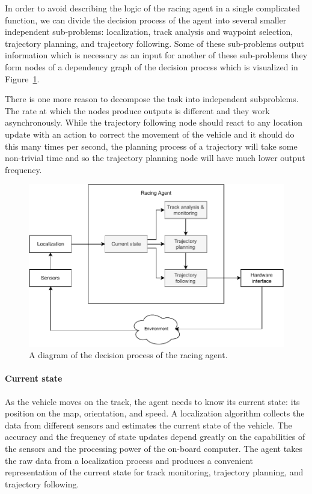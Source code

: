 In order to avoid describing the logic of the racing agent in a single complicated function, we can divide the decision process of the agent into several smaller independent sub-problems: localization, track analysis and waypoint selection, trajectory planning, and trajectory following. Some of these sub-problems output information which is necessary as an input for another of these sub-problems they form nodes of a dependency graph of the decision process which is visualized in Figure~\ref{fig:racing_agent_diagram}.

There is one more reason to decompose the task into independent subproblems. The rate at which the nodes produce outputs is different and they work asynchronously. While the trajectory following node should react to any location update with an action to correct the movement of the vehicle and it should do this many times per second, the planning process of a trajectory will take some non-trivial time and so the trajectory planning node will have much lower output frequency.

\begin{figure}[]\centering
	\includegraphics[width=125mm]{../img/racing_agent_diagram.pdf}
	\caption{A diagram of the decision process of the racing agent.}
	\label{fig:racing_agent_diagram}
\end{figure}

\paragraph{Current state} As the vehicle moves on the track, the agent needs to know its current state: its position on the map, orientation, and speed. A localization algorithm collects the data from different sensors and estimates the current state of the vehicle. The accuracy and the frequency of state updates depend greatly on the capabilities of the sensors and the processing power of the on-board computer. The agent takes the raw data from a localization process and produces a convenient representation of the current state for track monitoring, trajectory planning, and trajectory following.

